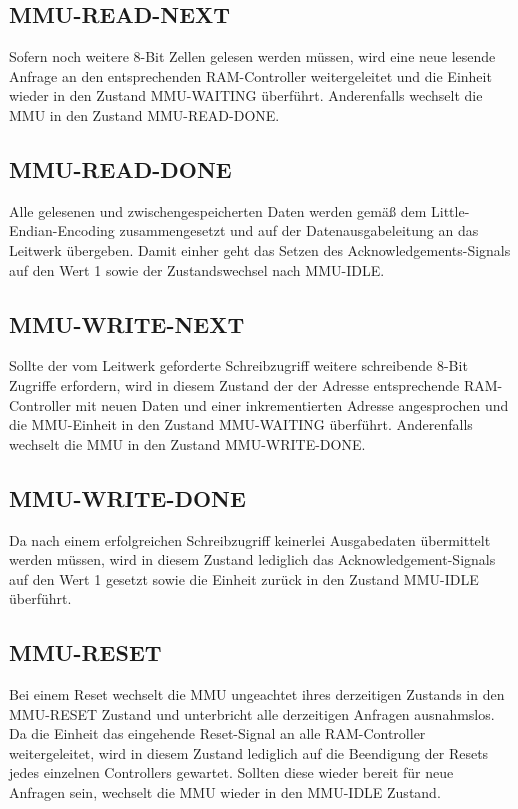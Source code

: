 \subsection{MMU-READ-NEXT}

Sofern noch weitere 8-Bit Zellen gelesen werden m\"ussen, wird eine neue lesende Anfrage an den entsprechenden RAM-Controller weitergeleitet und  die Einheit wieder in den Zustand MMU-WAITING \"uberf\"uhrt. Anderenfalls wechselt die MMU in den Zustand MMU-READ-DONE.

\subsection{MMU-READ-DONE}

Alle gelesenen und zwischengespeicherten Daten werden gem\"a\ss{} dem Little-Endian-Encoding zusammengesetzt und auf der Datenausgabeleitung an das Leitwerk \"ubergeben. Damit einher geht das Setzen des Acknowledgements-Signals  auf den Wert 1 sowie der Zustandswechsel nach MMU-IDLE.

\subsection{MMU-WRITE-NEXT}

Sollte der vom Leitwerk geforderte Schreibzugriff weitere schreibende 8-Bit Zugriffe erfordern, wird in diesem Zustand der der Adresse entsprechende RAM-Controller mit neuen Daten und einer inkrementierten Adresse angesprochen und die MMU-Einheit in den Zustand MMU-WAITING \"uberf\"uhrt. Anderenfalls wechselt die MMU in den Zustand MMU-WRITE-DONE.

\subsection{MMU-WRITE-DONE}

Da nach einem erfolgreichen Schreibzugriff keinerlei Ausgabedaten \"ubermittelt werden m\"ussen, wird in diesem Zustand lediglich das Acknowledgement-Signals  auf den Wert 1 gesetzt sowie die Einheit zur\"uck in den Zustand MMU-IDLE \"uberf\"uhrt.

\subsection{MMU-RESET}

Bei einem Reset wechselt die MMU ungeachtet ihres derzeitigen Zustands in den MMU-RESET Zustand und unterbricht alle derzeitigen Anfragen ausnahmslos. Da die Einheit das eingehende Reset-Signal an alle RAM-Controller weitergeleitet, wird in diesem Zustand lediglich auf  die Beendigung der Resets jedes einzelnen Controllers gewartet. Sollten diese wieder bereit f\"ur neue Anfragen sein, wechselt die MMU wieder in den MMU-IDLE Zustand.


